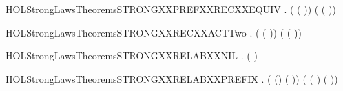 \newcommand{\HOLStrongLawsTheoremsSTRONGXXPARXXTAUXXTAU}{\UseVerbatim{HOLStrongLawsTheoremsSTRONGXXPARXXTAUXXTAU}}
\begin{SaveVerbatim}{HOLStrongLawsTheoremsSTRONGXXPREFXXRECXXEQUIV}
\HOLTokenTurnstile{} \HOLSymConst{\HOLTokenForall{}}  .
        (\HOLConst{\ensuremath{\mu}}  ( )) (\HOLConst{\ensuremath{\mu}}  ( ))
\end{SaveVerbatim}
\newcommand{\HOLStrongLawsTheoremsSTRONGXXPREFXXRECXXEQUIV}{\UseVerbatim{HOLStrongLawsTheoremsSTRONGXXPREFXXRECXXEQUIV}}
\begin{SaveVerbatim}{HOLStrongLawsTheoremsSTRONGXXRECXXACTTwo}
\HOLTokenTurnstile{} \HOLSymConst{\HOLTokenForall{}} .  (\HOLConst{\ensuremath{\mu}}  ( )) (\HOLConst{\ensuremath{\mu}}  ( ))
\end{SaveVerbatim}
\newcommand{\HOLStrongLawsTheoremsSTRONGXXRECXXACTTwo}{\UseVerbatim{HOLStrongLawsTheoremsSTRONGXXRECXXACTTwo}}
\begin{SaveVerbatim}{HOLStrongLawsTheoremsSTRONGXXRELABXXNIL}
\HOLTokenTurnstile{} \HOLSymConst{\HOLTokenForall{}}.  (  ) 
\end{SaveVerbatim}
\newcommand{\HOLStrongLawsTheoremsSTRONGXXRELABXXNIL}{\UseVerbatim{HOLStrongLawsTheoremsSTRONGXXRELABXXNIL}}
\begin{SaveVerbatim}{HOLStrongLawsTheoremsSTRONGXXRELABXXPREFIX}
\HOLTokenTurnstile{} \HOLSymConst{\HOLTokenForall{}}  .
        ( () ( ))
         ( ( )   ( ))
\end{SaveVerbatim}
\newcommand{\HOLStrongLawsTheoremsSTRONGXXRELABXXPREFIX}{\UseVerbatim{HOLStrongLawsTheoremsSTRONGXXRELABXXPREFIX}}
